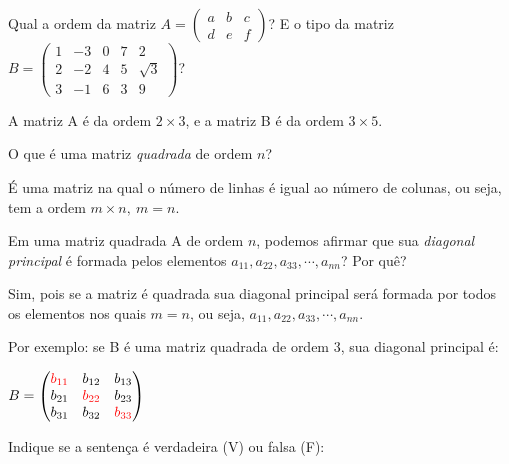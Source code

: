 \documentclass[pdftex, brazil, 12pt, oneside, addpoints]{exam}
\newcommand{\vf}[1][{}]{%
  \fillin[#1][0.25in]%
}
\begin{document}
\begin{questions}
\question
Qual a ordem da matriz
$A = \begin{pmatrix}
a & b & c\\
d & e & f\end{pmatrix}$? E o tipo da matriz
$B = \begin{pmatrix}
  1 & -3 & 0 & 7 & 2\\
  2 & -2 & 4 & 5 & \sqrt{3}\\
  3 & -1 & 6 & 3 & 9
\end{pmatrix}$?
\begin{solutionorlines}[0.50in]
  A matriz A é da ordem $2 \times 3$, e a matriz B é da ordem $3 \times 5$.
\end{solutionorlines}

\question
O que é uma matriz \emph{quadrada} de ordem $n$?
\begin{solutionorlines}[0.50in]
  É uma matriz na qual o número de linhas é igual ao número de colunas, ou seja,
  tem a ordem $m \times n,\ m = n$.
\end{solutionorlines}

\question
Em uma matriz quadrada A de ordem $n$, podemos afirmar que sua \emph{diagonal
  principal} é formada pelos elementos $a_{11}, a_{22}, a_{33}, \cdots, a_{nn}$? Por quê?
\begin{solutionorlines}[0.75in]
  Sim, pois se a matriz é quadrada sua diagonal principal será formada por todos os
  elementos nos quais $m = n$, ou seja, $a_{11}, a_{22}, a_{33}, \cdots, a_{nn}$.

  Por exemplo: se B é uma matriz quadrada de ordem 3, sua diagonal principal é:

  $B = \begin{pmatrix}
   \color{red} b_{11} & b_{12} & b_{13}\\
   b_{21} & \color{red} b_{22} & b_{23}\\
   b_{31} & b_{32} & \color{red} b_{33}
  \end{pmatrix}$ 
\end{solutionorlines}

\question
Indique se a sentença é verdadeira (V) ou falsa (F):
\end{questions}
\end{document}
